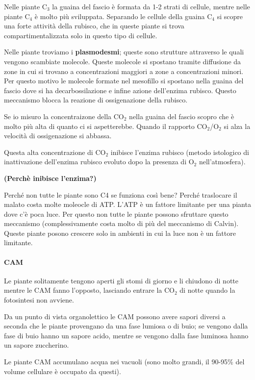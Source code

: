 \documentclass[]{article}
\begin{document}
Nelle piante C$_3$ la guaina del fascio è formata da 1-2 strati di
cellule, mentre nelle piante C$_4$ è molto più sviluppata. Separando le
cellule della guaina C$_4$ si scopre una forte attività della rubisco,
che in queste piante si trova compartimentalizzata solo in questo tipo
di cellule.

Nelle piante troviamo i \textbf{plasmodesmi}; queste sono strutture
attraverso le quali vengono scambiate molecole. Queste molecole si
spostano tramite diffusione da zone in cui si trovano a concentrazioni
maggiori a zone a concentrazioni minori. Per questo motivo le molecole
formate nel mesofillo si spostano nella guaina del fascio dove si ha
decarbossilazione e infine azione dell'enzima rubisco. Questo meccanismo
blocca la reazione di ossigenazione della rubisco.

Se io misuro la concentraizone della CO$_2$ nella guaina del fascio
scopro che è molto più alta di quanto ci si aspetterebbe. Quando il
rapporto CO$_2$/O$_2$ si alza la velocità di ossigenazione si abbassa.

Questa alta concentrazione di CO$_2$ inibisce l'enzima rubisco (metodo
istologico di inattivazione dell'enzima rubisco evoluto dopo la presenza
di O$_2$ nell'atmosfera).

\textbf{(Perchè inibisce l'enzima?)}

Perché non tutte le piante sono C4 se funziona così bene? Perché
traslocare il malato costa molte moleocle di ATP. L'ATP è un fattore
limitante per una pianta dove c'è poca luce. Per questo non tutte le
piante possono sfruttare questo meccanismo (complessivamente costa molto
di più del meccanismo di Calvin). Queste piante posono crescere solo in
ambienti in cui la luce non è un fattore limitante.

\paragraph{CAM}\label{cam}

Le piante solitamente tengono aperti gli stomi di giorno e li chiudono
di notte mentre le CAM fanno l'opposto, lasciando entrare la CO$_2$ di
notte quando la fotosintesi non avviene.

Da un punto di vista organolettico le CAM possono avere sapori diversi a
seconda che le piante provengano da una fase lumiosa o di buio; se
vengono dalla fase di buio hanno un sapore acido, mentre se vengono
dalla fase luminosa hanno un sapore zuccherino.

Le piante CAM accumulano acqua nei vacuoli (sono molto grandi, il
90-95\% del volume cellulare è occupato da questi).
\end{document}
